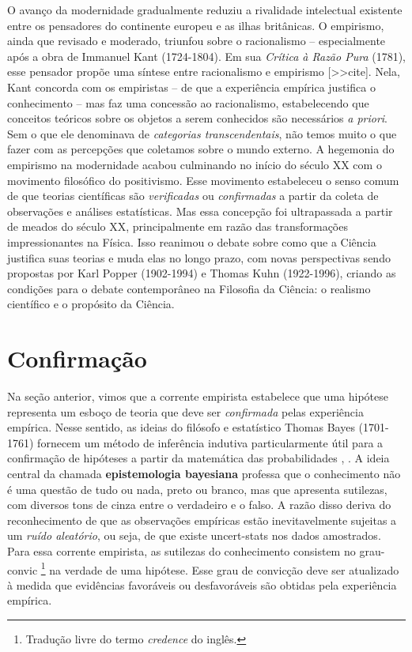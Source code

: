 \documentclass[./main.tex]{subfiles}
\begin{document}
\par O avanço da modernidade gradualmente reduziu a rivalidade intelectual existente entre os pensadores do continente europeu e as ilhas britânicas. O empirismo, ainda que revisado e moderado, triunfou sobre o racionalismo -- especialmente após a obra de Immanuel Kant (1724-1804). Em sua \textit{Crítica à Razão Pura} (1781), esse pensador propõe uma síntese entre racionalismo e empirismo [>>cite]. Nela, Kant concorda com os empiristas -- de que a experiência empírica justifica o conhecimento -- mas faz uma concessão ao racionalismo, estabelecendo que conceitos teóricos sobre os objetos a serem conhecidos são necessários \textit{a priori}. Sem o que ele denominava de \textit{categorias transcendentais}, não temos muito o que fazer com as percepções que coletamos sobre o mundo externo. A hegemonia do empirismo na modernidade  acabou culminando no início do século XX com o movimento filosófico do \gls{positivismo}. Esse movimento estabeleceu o senso comum de que teorias científicas são \textit{verificadas} ou \textit{confirmadas} a partir da coleta de observações e análises estatísticas. Mas essa concepção foi ultrapassada a partir de meados do século XX, principalmente em razão das transformações impressionantes na Física. Isso reanimou o debate sobre como que a Ciência justifica suas teorias e muda elas no longo prazo, com novas perspectivas sendo propostas por Karl Popper (1902-1994) e Thomas Kuhn (1922-1996), criando as condições para o debate contemporâneo na Filosofia da Ciência: o realismo científico e o propósito da Ciência.

\section{Confirmação} \label{sec:epis:bayes}

\par Na seção anterior, vimos que a corrente empirista estabelece que uma hipótese representa um esboço de teoria que deve ser \textit{confirmada} pelas experiência empírica. Nesse sentido, as ideias do filósofo e estatístico Thomas Bayes (1701-1761) fornecem um método de inferência indutiva particularmente útil para a confirmação de hipóteses a partir da matemática das probabilidades \cite{sep-epistemology-bayesian}, \cite{sprenger2019}. A ideia central da chamada \textbf{epistemologia bayesiana} professa que o conhecimento não é uma questão de tudo ou nada, preto ou branco, mas que apresenta sutilezas, com diversos tons de cinza entre o verdadeiro e o falso. A razão disso deriva do reconhecimento de que as observações empíricas estão inevitavelmente sujeitas a um \textit{ruído aleatório}, ou seja, de que existe \gls{uncert-stats} nos dados amostrados. Para essa corrente empirista, as sutilezas do conhecimento consistem no \gls{grau-convic} \footnote{Tradução livre do termo \textit{credence} do inglês.} na verdade de uma hipótese. Esse grau de convicção deve ser atualizado à medida que evidências favoráveis ou desfavoráveis são obtidas pela experiência empírica. 
\end{document}
